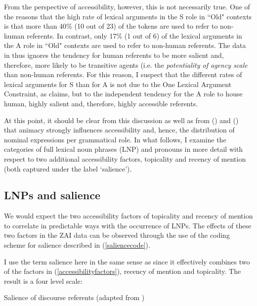 From the perspective of accessibility, however, this is not necessarily true. One of the reasons that the high rate of lexical arguments in the S role in ``Old" contexts is that more than 40{\%} (10 out of 23) of the tokens are used to refer to non-human referents. In contrast, only 17{\%} (1 out of 6) of the lexical arguments in the A role in ``Old" contexts are used to refer to non-human referents. The data in  thus ignores the tendency for human referents to be more salient and, therefore, more likely to be transitive agents (i.e. the \textit{potentiality of agency scale} \citep{silverstein1976} than non-human referents. For this reason, I suspect that the different rates of lexical arguments for S than for A is not due to the One Lexical Argument Constraint, as \citet{arnold2003} claims, but to the independent tendency for the A role to house human, highly salient and, therefore, highly accessible referents.


At this point, it should be clear from this discussion as well as from  () and  () that animacy strongly influences accessibility and, hence, the distribution of nominal expressions per grammatical role. In what follows, I examine the categories of full lexical noun phrases (LNP) and pronouns in more detail with respect to two additional accessibility factors, topicality and recency of mention (both captured under the label `salience').


\subsection{LNPs and salience}\label{coding}

We would expect the two accessibility factors of topicality and recency of mention to correlate in predictable ways with the occurrence of LNPs. The effects of these two factors in the ZAI data can be observed through the use of the coding scheme for salience described in (\ref{saliencecode}). 

I use the term salience here in the same sense as \citet{arnold2003} since it effectively combines two of the factors in (\ref{accessibilityfactors}), recency of mention and topicality. The result is a four level scale:


\ea\label{saliencecode}  Salience of discourse referents (adapted from \citet[231]{arnold2003})

